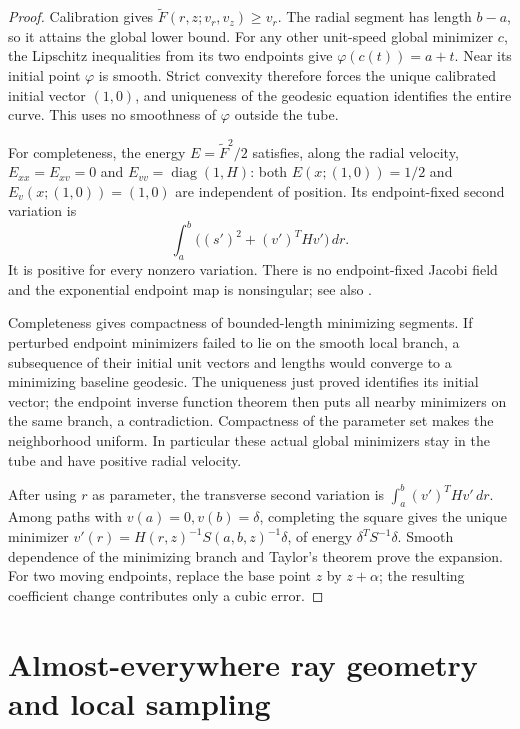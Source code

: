 \documentclass[11pt,reqno]{amsart}
\theoremstyle{definition}
\theoremstyle{remark}
\numberwithin{equation}{section}
\begin{document}
\begin{proof}
Calibration gives \(\widetilde F(r,z;v_r,v_z)\ge v_r\).
The radial segment has length \(b-a\), so it attains the global
lower bound. For any other unit-speed global minimizer \(c\),
the Lipschitz inequalities from its two endpoints give
\(\varphi(c(t))=a+t\). Near its initial point \(\varphi\) is
smooth. Strict convexity therefore forces the unique calibrated
initial vector \((1,0)\), and uniqueness of the geodesic equation
identifies the entire curve. This uses no smoothness of
\(\varphi\) outside the tube.

For completeness, the energy \(E=\widetilde F^2/2\) satisfies,
along the radial velocity, \(E_{xx}=E_{xv}=0\) and
\(E_{vv}=\operatorname{diag}(1,H)\): both
\(E(x;(1,0))=1/2\) and \(E_v(x;(1,0))=(1,0)\) are
independent of position. Its endpoint-fixed second variation is
\[
\int_a^b\bigl((s')^2+(v')^THv'\bigr)\,dr.
\]
It is positive for every nonzero variation. There is no
endpoint-fixed Jacobi field and the exponential endpoint map is
nonsingular; see also \cite[Proposition~2.16]{BhowmickPrasad}.

Completeness gives compactness of bounded-length minimizing
segments. If perturbed endpoint minimizers failed to lie on the
smooth local branch, a subsequence of their initial unit vectors
and lengths would converge to a minimizing baseline geodesic.
The uniqueness just proved identifies its initial vector; the
endpoint inverse function theorem then puts all nearby minimizers
on the same branch, a contradiction. Compactness of the parameter
set makes the neighborhood uniform. In particular these actual
global minimizers stay in the tube and have positive radial
velocity.

After using \(r\) as parameter, the transverse second variation
is \(\int_a^b(v')^THv'\,dr\). Among paths with
\(v(a)=0,v(b)=\delta\), completing the square gives the unique
minimizer
\(v'(r)=H(r,z)^{-1}S(a,b,z)^{-1}\delta\), of energy
\(\delta^TS^{-1}\delta\). Smooth dependence of the minimizing
branch and Taylor's theorem prove the expansion. For two moving
endpoints, replace the base point \(z\) by \(z+\alpha\);
the resulting coefficient change contributes only a cubic error.
\end{proof}

\section{Almost-everywhere ray geometry and local sampling}
\label{sec:rough-rays}
\end{document}
